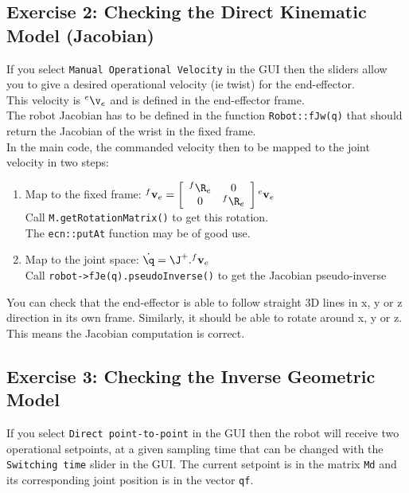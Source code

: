 \documentclass{ecnreport}
\begin{document}
\subsection*{Exercise 2: Checking the Direct Kinematic Model (Jacobian)}

If you select \texttt{Manual Operational Velocity} in the GUI then the sliders allow you to give a desired operational velocity (ie twist) for the end-effector.\\
This velocity is ${}^e\v_e$ and is defined in the end-effector frame.\\
The robot Jacobian has to be defined in the function \texttt{Robot::fJw(q)} that should return the Jacobian of the wrist in the fixed frame.\\


In the main code, the commanded velocity then to be mapped to the joint velocity in two steps:
\begin{enumerate}
	\item Map to the fixed frame: ${}^f\mathbf{v}_e = \left[\begin{array}{cc}{}^f\R_e & 0 \\ 0 & {}^f\R_e\end{array}\right]{}^e\mathbf{v}_e$\\
			Call \texttt{M.getRotationMatrix()} to get this rotation.\\
			The \texttt{ecn::putAt} function may be of good use.
	\item Map to the joint space: $\dot\q = \J^+.{}^f\mathbf{v}_e$\\
Call \texttt{robot->fJe(q).pseudoInverse()} to get the Jacobian pseudo-inverse
\end{enumerate}
You can check that the end-effector is able to follow straight 3D lines in x, y or z direction in its own frame.
Similarly, it should be able to rotate around x, y or z. This means the Jacobian computation is correct.

\newpage
\subsection*{Exercise 3: Checking the Inverse Geometric Model}

If you select \texttt{Direct point-to-point} in the GUI then the robot will receive two operational setpoints, at a given sampling time that can be changed with the \texttt{Switching time} slider in the GUI. The current setpoint is in the matrix \texttt{Md} and its corresponding joint position is in the vector \texttt{qf}. 
\end{document}
